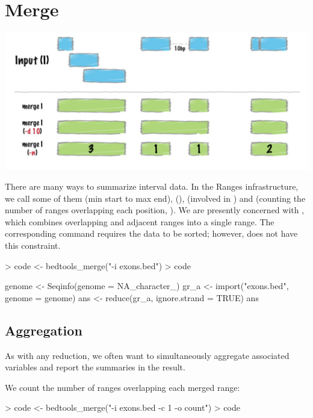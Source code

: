 \documentclass[10pt]{article}
\begin{document}
\section{Merge}
\includegraphics{fig/merge.jpg}

There are many ways to summarize interval data. In the Ranges
infrastructure, we call some of them  (min start to
max end),  (),
 (involved in ) and
 (counting the number of ranges overlapping each
position, ). We are presently concerned
with , which combines overlapping and adjacent
ranges into a single range. The corresponding  command requires the data to be sorted; however,
 does not have this constraint.

\begin{Schunk}
\begin{Sinput}
> code <- bedtools_merge("-i exons.bed")
> code
\end{Sinput}
\begin{Soutput}
{
    genome <- Seqinfo(genome = NA_character_)
    gr_a <- import("exons.bed", genome = genome)
    ans <- reduce(gr_a, ignore.strand = TRUE)
    ans
}
\end{Soutput}
\end{Schunk}

\subsection{Aggregation}

As with any reduction, we often want to simultaneously aggregate
associated variables and report the summaries in the result.

We count the number of ranges overlapping each merged range:
\begin{Schunk}
\begin{Sinput}
> code <- bedtools_merge("-i exons.bed -c 1 -o count")
> code
\end{Sinput}
\end{Schunk}
\end{document}
